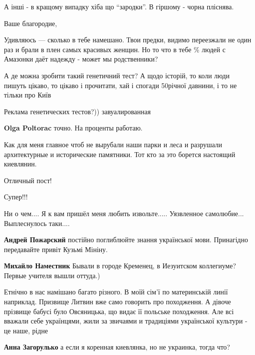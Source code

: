 \begin{itemize}
А інші - в кращому випадку хіба що \enquote{зародки}. В гіршому - чорна
пліснява.

Ваше благородие,

Удивляюсь — сколько в тебе намешано. Твои предки, видимо переезжали не один раз
и брали в плен самых красивых женщин. Но то что в тебе \% людей с Амазонки даёт
надежду - может мы родственники?


А де можна зробити такий генетичний тест? А щодо історій, то коли люди пишуть
цікаво, то цікаво і прочитати, хай і спогади 50річної давнини, і то не тільки про
Київ

Реклама генетических тестов?)) завуалированная

\textbf{Olga Poltorac} точно. На проценты работаю.


Как для меня главное чтоб не вырубали наши парки и леса и разрушали
архитектурные и исторические памятники. Тот кто за это борется настоящий
киевлянин.


Отличный пост!

Супер!!!


Ни о чем.... Я к вам пришёл меня любить извольте..... Уязвленное самолюбие...
Выплеснулось таки....

\begin{itemize} %
\textbf{Андрей Пожарский} постійно поглиблюйте знання української мови. Принагідно передавайте привіт Кузьмі Мініну.

\textbf{Михайло Наместник} Бывали в городе Кременец, в Иезуитском коллегиуме? Первые учителя вышли оттуда.)
\end{itemize} %


Етнічно в нас намішано багато різного. В моїй сім’ї по материнській линії
наприклад. Призвище Литвин вже само говорить про походження. А дівоче прізвище
бабусі було Овсяницька, що видає її польське походження. Але всі вважали себе
українцями, жили за звичаями и традиціями української культури - це наше, рідне

\begin{itemize} %
\textbf{Анна Загорулько} а если я коренная киевлянка, но не украинка, тогда что?


\end{itemize}
\end{itemize}
